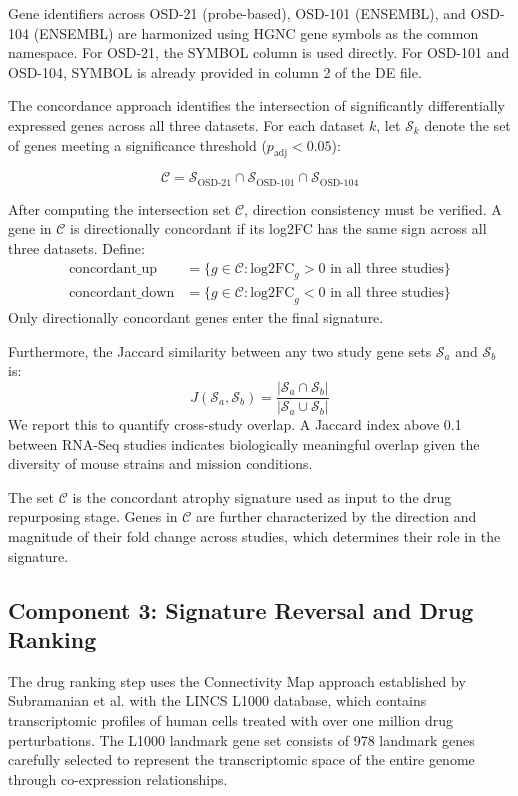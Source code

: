 \documentclass[conference]{IEEEtran}
\begin{document}
Gene identifiers across OSD-21 (probe-based), OSD-101 (ENSEMBL), and OSD-104 (ENSEMBL) are harmonized using HGNC gene symbols as the common namespace. For OSD-21, the SYMBOL column is used directly. For OSD-101 and OSD-104, SYMBOL is already provided in column 2 of the DE file.

The concordance approach identifies the intersection of significantly differentially expressed genes across all three datasets. For each dataset $k$, let $\mathcal{S}_k$ denote the set of genes meeting a significance threshold ($p_{\text{adj}} < 0.05$):

\begin{equation}
\mathcal{C} = \mathcal{S}_{\text{OSD-21}} \cap \mathcal{S}_{\text{OSD-101}} \cap \mathcal{S}_{\text{OSD-104}}
\label{eq:concordance}
\end{equation}

After computing the intersection set $\mathcal{C}$, direction consistency must be verified. A gene in $\mathcal{C}$ is directionally concordant if its log2FC has the same sign across all three datasets. Define:
\begin{align}
\text{concordant\_up} &= \{g \in \mathcal{C} : \text{log2FC}_g > 0 \text{ in all three studies}\} \\
\text{concordant\_down} &= \{g \in \mathcal{C} : \text{log2FC}_g < 0 \text{ in all three studies}\}
\end{align}
Only directionally concordant genes enter the final signature.

Furthermore, the Jaccard similarity between any two study gene sets $\mathcal{S}_a$ and $\mathcal{S}_b$ is:
\begin{equation}
J(\mathcal{S}_a, \mathcal{S}_b) = \frac{|\mathcal{S}_a \cap \mathcal{S}_b|}{|\mathcal{S}_a \cup \mathcal{S}_b|}
\label{eq:jaccard}
\end{equation}
We report this to quantify cross-study overlap. A Jaccard index above 0.1 between RNA-Seq studies indicates biologically meaningful overlap given the diversity of mouse strains and mission conditions.

The set $\mathcal{C}$ is the concordant atrophy signature used as input to the drug repurposing stage. Genes in $\mathcal{C}$ are further characterized by the direction and magnitude of their fold change across studies, which determines their role in the signature.

\subsection{Component 3: Signature Reversal and Drug Ranking}
The drug ranking step uses the Connectivity Map approach established by Subramanian et al. \cite{subramanian2017} with the LINCS L1000 database, which contains transcriptomic profiles of human cells treated with over one million drug perturbations. The L1000 landmark gene set consists of 978 landmark genes carefully selected to represent the transcriptomic space of the entire genome through co-expression relationships.
\end{document}
